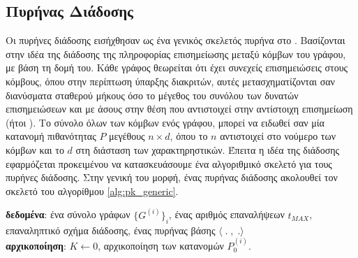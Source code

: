 \subsection{Πυρήνας Διάδοσης}
\label{ssec:p2k}
Οι πυρήνες διάδοσης εισήχθησαν ως ένα γενικός σκελετός πυρήνα στο \cite{Neumann2016}.
Βασίζονται στην ιδέα της διάδοσης της πληροφορίας επισημείωσης μεταξύ κόμβων του γράφου, με βάση τη δομή του.
Κάθε γράφος θεωρείται ότι έχει συνεχείς επισημειώσεις στους κόμβους, όπου στην περίπτωση ύπαρξης διακριτών, αυτές μετασχηματίζονται σαν διανύσματα σταθερού μήκους όσο το μέγεθος του συνόλου των δυνατών επισημειώσεων και με άσους στην θέση που αντιστοιχεί στην αντίστοιχη επισημείωση (ήτοι ).
Το σύνολο όλων των κόμβων ενός γράφου, μπορεί να ειδωθεί σαν μία κατανομή πιθανότητας $P$ μεγέθους $n \times d$, όπου το $n$ αντιστοιχεί στο νούμερο των κόμβων και το $d$ στη διάσταση των χαρακτηρηστικών.
Έπειτα η ιδέα της διάδοσης εφαρμόζεται προκειμένου να κατασκευάσουμε ένα αλγοριθμικό σκελετό για τους πυρήνες διάδοσης.
Στην γενική του μορφή, ένας πυρήνας διάδοσης ακολουθεί τον σκελετό του αλγορίθμου \ref{alg:pk_generic}.
\begin{algorithm}[]
\textbf{δεδομένα}: ένα σύνολο γράφων $\{G^{(i)}\}_{i}$, ένας αριθμός επαναλήψεων $t_{MAX}$, επαναληπτικό σχήμα διάδοσης, ένας πυρήνας βάσης $\langle\;.\;,\;. \rangle$
\\
\textbf{αρχικοποίηση}: $K \leftarrow 0$, αρχικοποίηση των κατανομών $P_{0}^{(i)}$.

\caption{}
\label{alg:pk_generic}
\end{algorithm}

